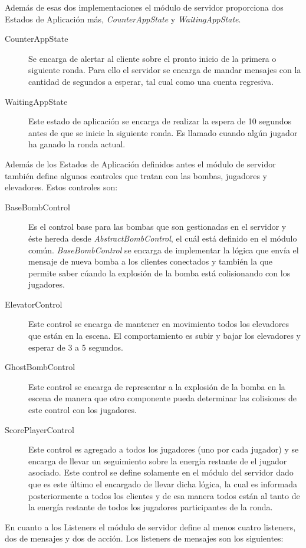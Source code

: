 \documentclass[a4paper,12pt,openany,oneside]{book}
\begin{document}
Además de esas dos implementaciones el módulo de servidor proporciona dos Estados de Aplicación más, \textit{CounterAppState} y \textit{WaitingAppState}.
\begin{description}
\item[CounterAppState] Se encarga de alertar al cliente sobre el pronto inicio de la primera o siguiente ronda. Para ello el servidor se encarga de mandar mensajes con la cantidad de segundos a esperar, tal cual como una cuenta regresiva.
\item[WaitingAppState] Este estado de aplicación se encarga de realizar la espera de 10 segundos antes de que se inicie la siguiente ronda. Es llamado cuando algún jugador ha ganado la ronda actual.
\end{description}

Además de los Estados de Aplicación definidos antes el módulo de servidor también define algunos controles que tratan con las bombas, jugadores y elevadores. Estos controles son:
\begin{description}
\item[BaseBombControl] Es el control base para las bombas que son gestionadas en el servidor y éste hereda desde \textit{AbstractBombControl}, el cuál está definido en el módulo común. \textit{BaseBombControl} se encarga de implementar la lógica que envía el mensaje de nueva bomba a los clientes conectados y también la que permite saber cúando la explosión de la bomba está colisionando con los jugadores.
\item[ElevatorControl] Este control se encarga de mantener en movimiento todos los elevadores que están en la escena. El comportamiento es subir y bajar los elevadores y esperar de 3 a 5 segundos.
\item[GhostBombControl] Este control se encarga de representar a la explosión de la bomba en la escena de manera que otro componente pueda determinar las colisiones de este control con los jugadores.
\item[ScorePlayerControl] Este control es agregado a todos los jugadores (uno por cada jugador) y se encarga de llevar un seguimiento sobre la energía restante de el jugador asociado. Este control se define solamente en el módulo del servidor dado que es este último el encargado de llevar dicha lógica, la cual es informada posteriormente a todos los clientes y de esa manera todos están al tanto de la energía restante de todos los jugadores participantes de la ronda.
\end{description}
En cuanto a los Listeners el módulo de servidor define al menos cuatro listeners, dos de mensajes y dos de acción. Los listeners de mensajes son los siguientes:
\end{document}
